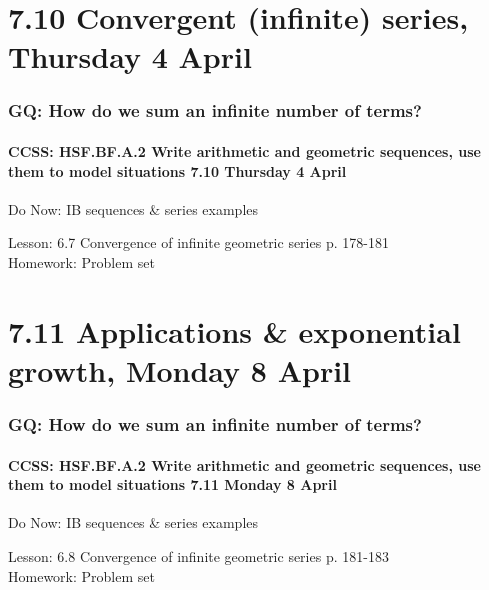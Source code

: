 \documentclass{beamer}
\begin{document}
  \section{7.10 Convergent (infinite) series, Thursday 4 April}
    \frame
    {
      \frametitle{GQ: How do we sum an infinite number of terms?}
      \framesubtitle{CCSS: HSF.BF.A.2 Write arithmetic and geometric sequences, use them to model situations \hfill \alert{7.10 Thursday 4 April}}

      \begin{block}{Do Now: IB sequences \& series examples}
      \end{block}
      Lesson: 6.7 Convergence of infinite geometric series p. 178-181\\[1cm]
      Homework: Problem set
    }

  \section{7.11 Applications \& exponential growth, Monday 8 April}
    \frame
    {
      \frametitle{GQ: How do we sum an infinite number of terms?}
      \framesubtitle{CCSS: HSF.BF.A.2 Write arithmetic and geometric sequences, use them to model situations \hfill \alert{7.11 Monday 8 April}}

      \begin{block}{Do Now: IB sequences \& series examples}
      \end{block}
      Lesson: 6.8 Convergence of infinite geometric series p. 181-183\\[1cm]
      Homework: Problem set
    }
\end{document}
